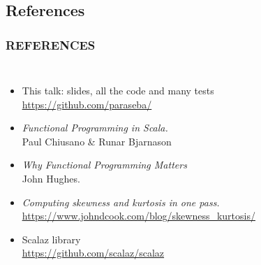 \documentclass{beamer}
\begin{document}
\subsection*{References}
\begin{frame} \frametitle{REFERENCES}
  \begin{columns}[c]
      \begin{itemize}

        \item This talk: slides, all the \alert{code and many tests} \\
          \href{https://github.com/paraseba/}{\underline{https://github.com/paraseba/}} %

        \item \textit{Functional Programming in Scala.}\\ Paul Chiusano \& Runar Bjarnason

        \item \textit{Why Functional Programming Matters} \\
          John Hughes.

        \item \textit{Computing skewness and kurtosis in one pass.} \\
          {\footnotesize \href{https://www.johndcook.com/blog/skewness\_kurtosis/}{\underline{https://www.johndcook.com/blog/skewness\_kurtosis/}}}

        \item Scalaz library \\
          {\href{https://github.com/scalaz/scalaz}{\underline{https://github.com/scalaz/scalaz}}}
      \end{itemize}



\end{columns}
\end{frame}
\end{document}
